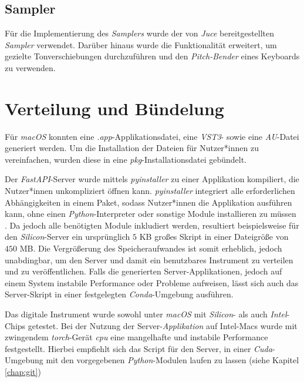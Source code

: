 \documentclass[
  a4paper,  %
  twoside,  %
  bibliography=totoc,
  headsepline,
  cleardoublepage=empty,
  parskip=half,
  draft=false
]{scrbook}
\begin{document}
\subsection{Sampler}

Für die Implementierung des \emph{Samplers} wurde der von \emph{Juce} bereitgestellten \emph{Sampler} \cite{noauthor_sampler_nodate} verwendet. Darüber hinaus wurde die Funktionalität erweitert, um gezielte Tonverschiebungen durchzuführen und den \emph{Pitch-Bender} eines Keyboards zu verwenden.

\section{Verteilung und Bündelung}

Für \emph{macOS} konnten eine \emph{.app}-Applikationsdatei, eine \emph{VST3}- sowie eine \emph{AU}-Datei generiert werden. Um die Installation der Dateien für Nutzer*innen zu vereinfachen, wurden diese in eine \emph{pkg}-Installationsdatei gebündelt. 

Der \emph{FastAPI}-Server wurde mittels \emph{pyinstaller} \cite{noauthor_pyinstaller_nodate} zu einer Applikation kompiliert, die Nutzer*innen unkompliziert öffnen kann. \emph{pyinstaller} integriert alle erforderlichen Abhängigkeiten in einem Paket, sodass Nutzer*innen die Applikation ausführen kann, ohne einen \emph{Python}-Interpreter oder sonstige Module installieren zu müssen \cite{noauthor_pyinstaller_nodate}. Da jedoch alle benötigten Module inkludiert werden, resultiert beispielsweise für den \emph{Silicon}-Server ein ursprünglich $5$ KB großes Skript in einer Dateigröße von $450$ MB. Die Vergrößerung des Speicheraufwandes ist somit erheblich, jedoch unabdingbar, um den Server und damit ein benutzbares Instrument zu verteilen und zu veröffentlichen. Falls die generierten Server-Applikationen, jedoch auf einem System instabile Performance oder Probleme aufweisen, lässt sich auch das Server-Skript in einer festgelegten \emph{Conda}-Umgebung ausführen. 

Das digitale Instrument wurde sowohl unter \emph{macOS} mit \emph{Silicon}- als auch \emph{Intel}-Chips getestet. Bei der Nutzung der Server-\emph{Applikation} auf Intel-Macs wurde mit zwingendem \emph{torch}-Gerät \emph{cpu} eine mangelhafte und instabile Performance festgestellt. Hierbei empfiehlt sich das Script für den Server, in einer \emph{Cuda}-Umgebung mit den vorgegebenen \emph{Python}-Modulen laufen zu lassen (siehe Kapitel \ref{chap:git})
\end{document}
